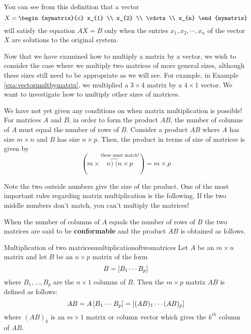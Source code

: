 You can see from this definition that a vector 
\begin{equation*}
X =
\begin{mymatrix}{c}
x_{1} \\
x_{2} \\
\vdots \\
x_{n}
\end{mymatrix}
\end{equation*}
will satisfy the equation $AX=B$
only when the entries $x_{1}, x_{2}, \cdots, x_{n}$ of the vector $X$ are solutions to the original system.

Now that we have examined how to multiply a matrix by a vector, we
wish to consider the case where we multiply two matrices of more
general sizes, although these sizes still need to be appropriate as we
will see. For example, in Example \ref{exa:vectormultbymatrix}, we
multiplied a $3 \times 4$ matrix by a $4 \times 1$ vector.  We want to
investigate how to multiply other sizes of matrices.

We have not yet given any conditions on when matrix multiplication is
possible!  For matrices $A$ and $B$, in order to form the product
$AB$, the number of columns of $A$ must equal the number of rows of
$B.$ Consider a product $AB$ where $A$ has size $m\times n$ and $B$
has size $n \times p$. Then, the product in terms of size of matrices
is given by
\begin{equation*}
(m\times\overset{\text{these must match!}}{\widehat{n)\;(n}\times p})=m\times p
\end{equation*}

Note the two outside numbers give the size of the product. One of the most important rules regarding matrix multiplication is the following. 
If the two middle numbers don't match, you can't multiply the
matrices!

When the number of columns of $A$ equals the number of rows
of $B$ the two matrices are said to be
\textbf{conformable} and the product
$AB$  is obtained as follows.

\begin{definition}{Multiplication of two matrices}{multiplicationoftwomatrices}
 Let $A$ be an $m\times n$ matrix
and let $B$ be an $n\times p$ matrix of the form
\begin{equation*}
B=\left[ B_{1} \cdots  B_{p}\right]
\end{equation*}
where $B_{1},...,B_{p}$ are the $n\times 1$ columns of $B$. Then the 
$m\times p$ matrix $AB$ is defined as follows:
\begin{equation*}
AB = A \left[ B_{1} \cdots  B_{p}\right] =  \left[ (A B)_{1} \cdots  (AB)_{p}\right] 
\end{equation*}
where $(AB)_{k}$ is an $m\times 1$ matrix or column vector which
gives the $k^{th}$ column of $AB$. 
\end{definition}

